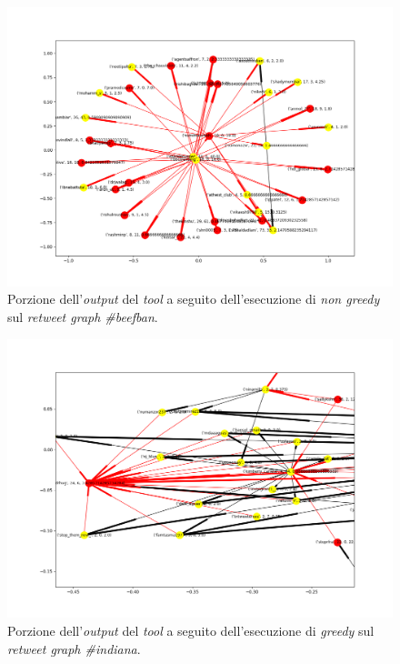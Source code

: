 \begin{figure}
\begin{center}
\includegraphics[scale=0.5]{images/beefban_in_degree_probability_free.png}
\end{center}
\caption{Porzione dell'\textit{output} del \textit{tool} a seguito dell'esecuzione di \textit{non greedy} sul \textit{retweet graph \#beefban}.}
\label{fig:beefnotgreedy}
\end{figure}

\begin{figure}
\begin{center}
\includegraphics[scale=0.5]{images/indiana_in_degree_greedy_probability_free.png}
\end{center}
\caption{Porzione dell'\textit{output} del \textit{tool} a seguito dell'esecuzione di \textit{greedy} sul \textit{retweet graph \#indiana}.}
\label{fig:indigreedy}
\end{figure}

